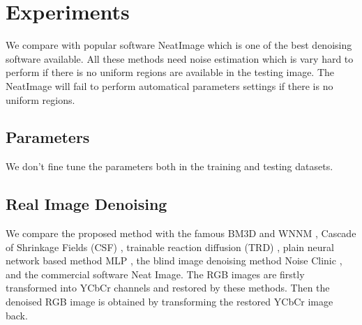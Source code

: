 \documentclass[10pt,twocolumn,letterpaper]{article}
\begin{document}
\section{Experiments}

We compare with popular software NeatImage which is one of the best denoising software available. All these methods need noise estimation which is vary hard to perform if there is no uniform regions are available in the testing image. The NeatImage will fail to perform automatical parameters settings if there is no uniform regions.

\subsection{Parameters}
We don't fine tune the parameters both in the training and testing datasets.

\subsection{Real Image Denoising}
We compare the proposed method with the famous BM3D \cite{bm3d} and WNNM \cite{wnnm}, Cascade of Shrinkage Fields (CSF) \cite{csf}, trainable reaction diffusion (TRD) \cite{chen2015learning}, plain neural network based method MLP \cite{burger2012image}, the blind image denoising method Noise Clinic \cite{noiseclinic}, and the commercial software Neat Image. The RGB images are firstly transformed into YCbCr channels and restored by these methods. Then the denoised RGB image is obtained by transforming the restored YCbCr image back.
\end{document}
